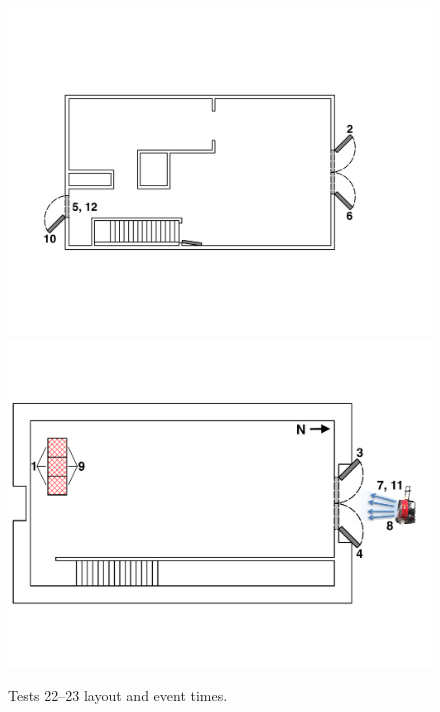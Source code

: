 \documentclass[12pt,oneside]{book}
\begin{document}
\begin{figure}[!ht]
\begin{minipage}[b]{0.8\columnwidth}
\begin{flushleft}
	\end{flushleft}
\end{minipage}
\begin{minipage}[b]{0.9\columnwidth}
	\vspace{15pt}
	\centering
	\includegraphics[width=\columnwidth]{../Figures/Floor_Plans/West_Structure_2nd_Floor_Test_22}
	\includegraphics[width=0.95\columnwidth]{../Figures/Floor_Plans/West_Structure_1st_Floor_Test_22}
\end{minipage}
\caption{Tests 22--23 layout and event times.}
\label{fig:west_test_22}
\end{figure}
\end{document}
